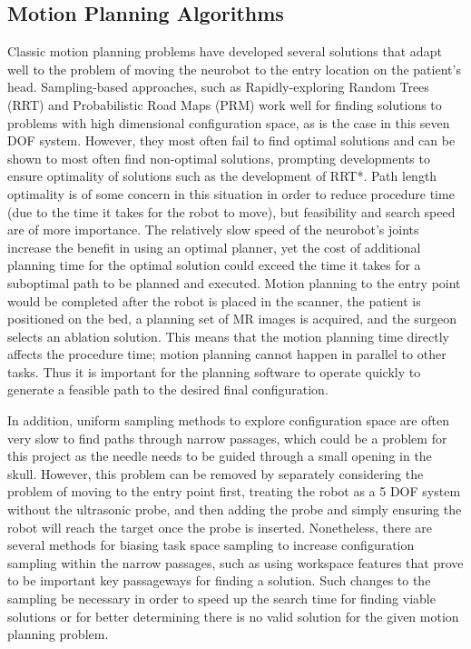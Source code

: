 \documentclass[12pt]{report}
\begin{document}
\subsection{Motion Planning Algorithms}
Classic motion planning problems have developed several solutions that adapt well to the problem of moving the neurobot to the entry location on the patient's head. Sampling-based approaches, such as Rapidly-exploring Random Trees (RRT) and Probabilistic Road Maps (PRM) work well for finding solutions to problems with high dimensional configuration space, as is the case in this seven DOF system. \cite{planningAlgorithms} However, they most often fail to find optimal solutions and can be shown to most often find non-optimal solutions, prompting developments to ensure optimality of solutions such as the development of RRT*. \cite{rrtStar} Path length optimality is of some concern in this situation in order to reduce procedure time (due to the time it takes for the robot to move), but feasibility and search speed are of more importance.  The relatively slow speed of the neurobot's joints increase the benefit in using an optimal planner, yet the cost of additional planning time for the optimal solution could exceed the time it takes for a suboptimal path to be planned and executed. Motion planning to the entry point would be completed after the robot is placed in the scanner, the patient is positioned on the bed, a planning set of MR images is acquired, and the surgeon selects an ablation solution. This means that the motion planning time directly affects the procedure time; motion planning cannot happen in parallel to other tasks. Thus it is important for the planning software to operate quickly to generate a feasible path to the desired final configuration.

In addition, uniform sampling methods to explore configuration space are often very slow to find paths through narrow passages, which could be a problem for this project as the needle needs to be guided through a small opening in the skull. However, this problem can be removed by separately considering the problem of moving to the entry point first, treating the robot as a 5 DOF system without the ultrasonic probe, and then adding the probe and simply ensuring the robot will reach the target once the probe is inserted. Nonetheless, there are several methods for biasing task space sampling to increase configuration sampling within the narrow passages, such as using workspace features that prove to be important key passageways for finding a solution. \cite{workspaceBiasing} Such changes to the sampling be necessary in order to speed up the search time for finding viable solutions or for better determining there is no valid solution for the given motion planning problem. 
\end{document}
